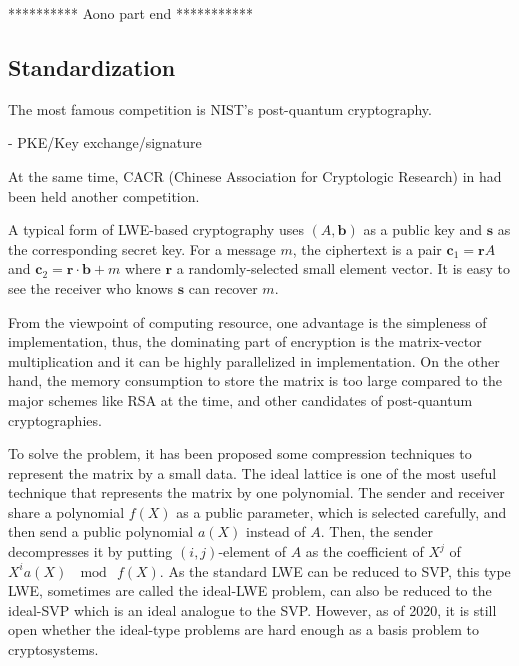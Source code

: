 ********** Aono part end ***********




\subsection{Standardization}

The most famous competition is NIST's post-quantum cryptography.

 - PKE/Key exchange/signature

At the same time, CACR (Chinese Association for Cryptologic Research) in had been held another competition.


\fi




A typical form of LWE-based cryptography uses $(A, \bm{b})$ 
as a public key and $\bm{s}$ as the corresponding secret key. 
For a message $m$, the ciphertext is a pair $\bm{c}_1 = \bm{r}A$ and $\bm{c}_2 = \bm{r} \cdot \bm{b} + m$ where $\bm{r}$ a randomly-selected small element vector.
It is easy to see the receiver who knows $\bm{s}$ can recover $m$.

From the viewpoint of computing resource, one advantage is 
the simpleness of implementation, thus, the dominating part of encryption is the matrix-vector multiplication and it can be highly parallelized in implementation.
On the other hand, the memory consumption to store the matrix is too large compared to the major schemes like RSA at the time, and other candidates of post-quantum cryptographies.

To solve the problem, it has been proposed some compression techniques to represent the matrix by a small data.
The ideal lattice is one of the most useful technique that represents 
the matrix by one polynomial.
The sender and receiver share a polynomial $f(X)$ as a public parameter, which is selected carefully, and then send a public polynomial $a(X)$ instead of $A$.
Then, the sender decompresses it by putting $(i,j)$-element of $A$ as the coefficient of $X^j$ of $X^i a(X)\ \mod\ f(X)$.
As the standard LWE can be reduced to SVP, this type LWE, sometimes are called the ideal-LWE problem, can also be reduced to the ideal-SVP which is an ideal analogue to the SVP.
However, as of 2020, it is still open whether the ideal-type problems are hard enough as a basis problem to cryptosystems.
\fi

